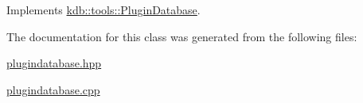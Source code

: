 Implements \hyperlink{classkdb_1_1tools_1_1PluginDatabase_a43abe56a024218ecee48526ced699f05}{kdb\+::tools\+::\+Plugin\+Database}.



The documentation for this class was generated from the following files\+:\begin{DoxyCompactItemize}
\item 
\hyperlink{plugindatabase_8hpp}{plugindatabase.\+hpp}\item 
\hyperlink{plugindatabase_8cpp}{plugindatabase.\+cpp}\end{DoxyCompactItemize}
